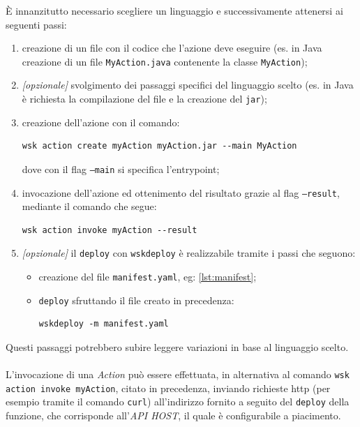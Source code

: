 \documentclass[12pt,a4paper,openany,twoside]{book}
\begin{document}
È innanzitutto necessario scegliere un linguaggio e successivamente attenersi ai seguenti passi:
\begin{enumerate}
    \item creazione di un file con il codice che l'azione deve eseguire (es. in Java creazione di un file \texttt{MyAction.java} contenente la classe \texttt{MyAction});
    
    \item \textit{[opzionale]} svolgimento dei passaggi specifici del linguaggio scelto (es. in Java è richiesta la compilazione del file e la creazione del \texttt{jar});
    
    \item creazione dell'azione con il comando:\begin{lstlisting}
wsk action create myAction myAction.jar --main MyAction\end{lstlisting}
    dove con il flag \texttt{--main} si specifica l'entrypoint;
    
    \item invocazione dell'azione ed ottenimento del risultato grazie al flag \texttt{--result}, mediante il comando che segue:\begin{lstlisting}
wsk action invoke myAction --result\end{lstlisting}
    
    \item \textit{[opzionale]} il \texttt{deploy} con \texttt{wskdeploy} è realizzabile tramite i passi che seguono:
        \begin{itemize}
            \item creazione del file \texttt{manifest.yaml}, eg: \cref{lst:manifest}; 
            
            
            
            \item \texttt{deploy} sfruttando il file creato in precedenza:\begin{lstlisting}
wskdeploy -m manifest.yaml\end{lstlisting}
        \end{itemize}
\end{enumerate}
Questi passaggi potrebbero subire leggere variazioni in base al linguaggio scelto.
\\ \\
L'invocazione di una \textit{Action} può essere effettuata, in alternativa al comando \texttt{wsk action invoke myAction}, citato in precedenza, inviando richieste \ac{http} (per esempio tramite il comando \texttt{curl}) all'indirizzo fornito a seguito del \texttt{deploy} della funzione, che corrisponde all'\textit{API HOST}, il quale è configurabile a piacimento.
\end{document}
